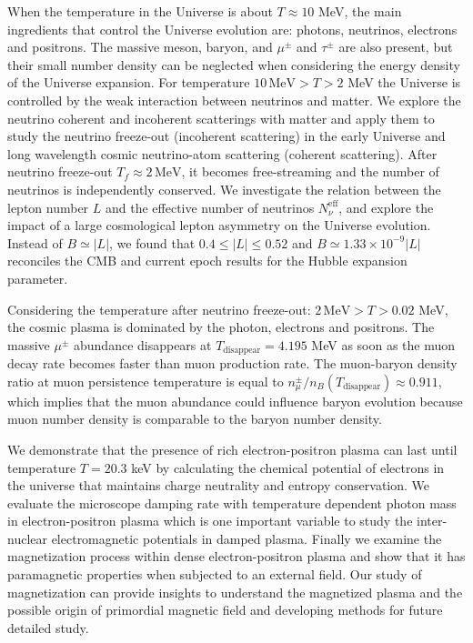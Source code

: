 When the temperature in the Universe is about $T\approx10$ MeV, the main ingredients that control the Universe evolution are: photons, neutrinos, electrons and positrons. The massive meson, baryon, and $\mu^\pm$ and $\tau^\pm$ are also present, but their small number density can be neglected when considering the energy density of the Universe expansion. For temperature $10\,\mathrm{MeV}>T>2$ MeV the Universe is controlled by the weak interaction between neutrinos and matter. We explore the neutrino coherent and incoherent scatterings with matter and apply them to study the neutrino freeze-out (incoherent scattering) in the early Universe and  long wavelength cosmic neutrino-atom scattering (coherent scattering). After neutrino freeze-out $T_f\approx2\,\mathrm{MeV}$, it becomes free-streaming and the number of neutrinos is independently conserved. We investigate the relation between the lepton number $L$ and the effective number of neutrinos $N^{\mathrm{eff}}_\nu$, and explore the impact of a large cosmological lepton asymmetry on the Universe evolution. Instead of $B\simeq |L|$, we found that $0.4\leqslant|L| \leqslant0.52$ and $B\simeq 1.33\times 10^{-9}|L|$ reconciles the CMB and current epoch results for the Hubble expansion parameter. 
 


Considering the temperature after neutrino freeze-out: $2\,\mathrm{MeV}>T>0.02$ MeV, the cosmic plasma is dominated by the photon, electrons and positrons. The massive $\mu^\pm$ abundance disappears at $T_\mathrm{disappear}=4.195$ MeV as soon as the muon decay rate becomes faster than muon production rate. The muon-baryon density ratio at  muon persistence temperature is equal to $n_\mu^\pm/n_B(T_\mathrm{disappear})\approx0.911$, which implies that the muon abundance could influence baryon evolution because muon number density is comparable to the baryon number density. 

We demonstrate that the presence of rich electron-positron plasma can last until temperature $T=20.3$ keV by calculating the chemical potential of electrons in the universe that maintains charge neutrality and entropy conservation.
We evaluate the microscope damping rate with temperature dependent photon mass in electron-positron plasma which is one important variable to study the inter-nuclear electromagnetic potentials  in damped plasma. Finally  we examine the magnetization process within dense electron-positron plasma and show that it has paramagnetic properties when subjected to an external field. Our study of magnetization can provide insights to understand the magnetized plasma and the possible origin of primordial magnetic field and  developing methods for
future detailed study.

